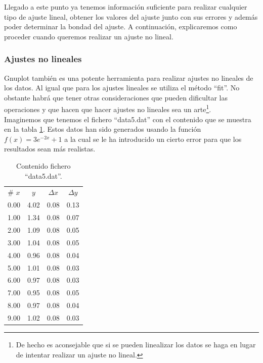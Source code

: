 \documentclass[11pt,a4paper,twoside,pdf]{article}
\numberwithin{equation}{section}
\begin{document}
Llegado a este punto ya tenemos información suficiente para realizar cualquier tipo de ajuste lineal, obtener los valores del ajuste junto con sus errores y además poder determinar la bondad del ajuste. A continuación, explicaremos como proceder cuando queremos realizar un ajuste no lineal.

\subsubsection{Ajustes no lineales}

Gnuplot también es una potente herramienta para realizar ajustes no lineales de los datos. Al igual que para los ajustes lineales se utiliza el método ``fit''. No obstante habrá que tener otras consideraciones que pueden dificultar las operaciones y que hacen que hacer ajustes no lineales sea un arte\footnote{De hecho es aconsejable que si se pueden linealizar los datos se haga en lugar de intentar realizar un ajuste no lineal.}.\\

Imaginemos que tenemos el fichero ``data5.dat'' con el contenido que se muestra en la tabla \ref{tab:data_plot_nonlinfit}. Estos datos han sido generados usando la función $f(x) = 3e^{-2x} + 1$ a la cual se le ha introducido un cierto error para que los resultados sean más realistas. \\

\begin{table}[h]
 \centering
 \caption{Contenido fichero ``data5.dat''.}
 \vspace{10pt}
 \label{tab:data_plot_nonlinfit}
 \begin{tabular}{cccc}
  \# $x$ & $y$ & $\Delta x$ & $\Delta y$ \\
	0.00 & 4.02 & 0.08 & 0.13 \\
	1.00 & 1.34 & 0.08 & 0.07 \\
	2.00 & 1.09 & 0.08 & 0.05 \\
	3.00 & 1.04 & 0.08 & 0.05 \\
	4.00 & 0.96 & 0.08 & 0.04 \\
	5.00 & 1.01 & 0.08 & 0.03 \\
	6.00 & 0.97 & 0.08 & 0.03 \\
	7.00 & 0.95 & 0.08 & 0.05 \\
	8.00 & 0.97 & 0.08 & 0.04 \\
	9.00 & 1.02 & 0.08 & 0.03 \\
 \end{tabular}
\end{table}
\end{document}

